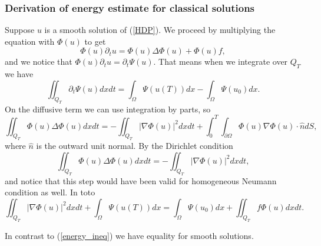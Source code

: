 \documentclass[11pt, a4paper]{article}
\begin{document}
\subsubsection{Derivation of energy estimate for classical solutions}
Suppose $u$ is a smooth solution of (\ref{HDP}). We proceed by multiplying the equation with $\Phi(u)$ to get
\begin{equation*}
\Phi(u)\partial_t u = \Phi(u)\Delta \Phi(u) + \Phi(u)f,
\end{equation*}
and we notice that $\Phi(u)\partial_t u = \partial_t \Psi(u)$. That means when we integrate over $Q_T$ we have
\begin{equation*}
\iint_{Q_T} \partial_t \Psi(u)dxdt = \int_\Omega \Psi(u(T))dx - \int_\Omega \Psi(u_0)dx.
\end{equation*}
On the diffusive term we can use integration by parts, so
\begin{equation*}
\iint_{Q_T}\Phi(u) \Delta \Phi(u) dxdt = -\iint_{Q_T} |\nabla \Phi(u)|^2dxdt + \int_0^T \int_{\partial\Omega} \Phi(u)\nabla \Phi(u) \cdot \hat{n}dS,
\end{equation*}
where $\hat{n}$ is the outward unit normal. By the Dirichlet condition
\begin{equation*}
\iint_{Q_T}\Phi(u) \Delta \Phi(u) dxdt = -\iint_{Q_T} |\nabla \Phi(u)|^2dxdt,
\end{equation*}
and notice that this step would have been valid for homogeneous Neumann condition as well. In toto 
\begin{equation}
\iint_{Q_T} |\nabla \Phi(u)|^2dxdt + \int_\Omega \Psi(u(T))dx = \int_\Omega \Psi(u_0)dx + \iint_{Q_T} f\Phi(u)dxdt.
\end{equation}

\setcounter{obs}{0}
\begin{obs}
In contrast to (\ref{energy_ineq}) we have equality for smooth solutions.
\end{obs}
\end{document}
